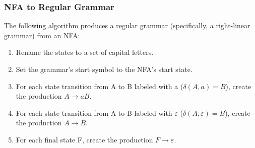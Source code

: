 \documentclass{article}
\newcommand{\emptystr}{\varepsilon}
\theoremstyle{definition}
\begin{document}
\subsubsection*{NFA to Regular Grammar}
The following algorithm produces a regular grammar (specifically, a right-linear grammar) from an NFA:
\begin{enumerate}
\item Rename the states to a set of capital letters.
\item Set the grammar's start symbol to the NFA's start state.
\item For each state transition from A to B labeled with a ($\delta(A,a) = B$), create the production $A \to aB$.
\item For each state transition from A to B labeled with $\emptystr$
  ($\delta(A,\emptystr) = B$), create the production $A \to B$.
\item For each final state F, create the production $F \to \emptystr$.
\end{enumerate}



\end{document}
